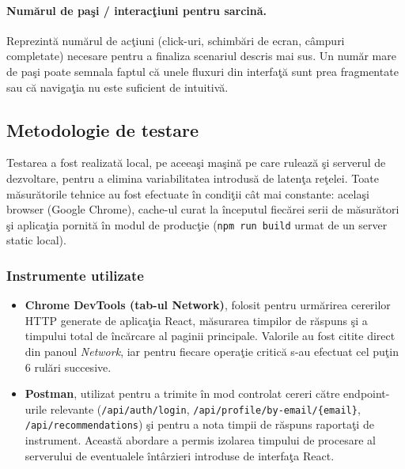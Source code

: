 \documentclass[12pt,a4paper]{article}
\begin{document}
\paragraph{Num\u{a}rul de pa\c{s}i / interac\c{t}iuni pentru sarcin\u{a}.}
Reprezint\u{a} num\u{a}rul de ac\c{t}iuni (click-uri, schimb\u{a}ri de ecran, c\^{a}mpuri completate) necesare pentru a finaliza scenariul descris mai sus. Un num\u{a}r mare de pa\c{s}i poate semnala faptul c\u{a} unele fluxuri din interfa\c{t}\u{a} sunt prea fragmentate sau c\u{a} naviga\c{t}ia nu este suficient de intuitiv\u{a}.

\subsection*{Metodologie de testare}

Testarea a fost realizat\u{a} local, pe aceea\c{s}i ma\c{s}in\u{a} pe care ruleaz\u{a} \c{s}i serverul de dezvoltare, pentru a elimina variabilitatea introdus\u{a} de laten\c{t}a re\c{t}elei. Toate m\u{a}sur\u{a}torile tehnice au fost efectuate \^{i}n condi\c{t}ii c\^{a}t mai constante: acela\c{s}i browser (Google Chrome), cache-ul curat la \^{i}nceputul fiec\u{a}rei serii de m\u{a}sur\u{a}tori \c{s}i aplica\c{t}ia pornit\u{a} \^{i}n modul de produc\c{t}ie (\texttt{npm run build} urmat de un server static local).

\subsubsection*{Instrumente utilizate}

\begin{itemize}
  \item \textbf{Chrome DevTools (tab-ul Network)}, folosit pentru urm\u{a}rirea cererilor HTTP generate de aplica\c{t}ia React, m\u{a}surarea timpilor de r\u{a}spuns \c{s}i a timpului total de \^{i}nc\u{a}rcare al paginii principale. Valorile au fost citite direct din panoul \textit{Network}, iar pentru fiecare opera\c{t}ie critic\u{a} s-au efectuat cel pu\c{t}in 6 rul\u{a}ri succesive.
  \item \textbf{Postman}, utilizat pentru a trimite \^{i}n mod controlat cereri c\u{a}tre endpoint-urile relevante (\texttt{/api/auth/login}, \texttt{/api/profile/by-email/\{email\}}, \texttt{/api/recommendations}) \c{s}i pentru a nota timpii de r\u{a}spuns raporta\c{t}i de instrument. Aceast\u{a} abordare a permis izolarea timpului de procesare al serverului de eventualele \^{i}nt\^{a}rzieri introduse de interfa\c{t}a React.
\end{itemize}
\end{document}
